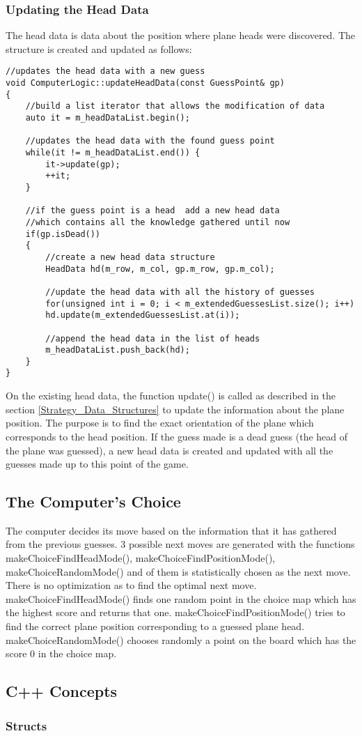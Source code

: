 \subsubsection {Updating the Head Data}

The head data is data about the position where plane heads were discovered. The structure is created and updated as follows:

\begin{lstlisting}
//updates the head data with a new guess
void ComputerLogic::updateHeadData(const GuessPoint& gp)
{
	//build a list iterator that allows the modification of data
	auto it = m_headDataList.begin();
	
	//updates the head data with the found guess point
	while(it != m_headDataList.end()) {
		it->update(gp);
		++it;
	}
	
	//if the guess point is a head  add a new head data
	//which contains all the knowledge gathered until now
	if(gp.isDead())
	{
		//create a new head data structure
		HeadData hd(m_row, m_col, gp.m_row, gp.m_col);
		
		//update the head data with all the history of guesses
		for(unsigned int i = 0; i < m_extendedGuessesList.size(); i++)
		hd.update(m_extendedGuessesList.at(i));
		
		//append the head data in the list of heads
		m_headDataList.push_back(hd);
	}
}
\end{lstlisting}

On the existing head data, the function update() is called as described in the section \ref{Strategy_Data_Structures} to update the information about the plane position. The purpose is to find the exact orientation of the plane which corresponds to the head position. If the guess made is a dead guess (the head of the plane was guessed), a new head data is created and updated with all the guesses made up to this point of the game.


\subsection {The Computer's Choice}

The computer decides its move based on the information that it has gathered from the previous guesses. 3 possible next moves are generated with the functions makeChoiceFindHeadMode(),  makeChoiceFindPositionMode(),  makeChoiceRandomMode() and of them is statistically chosen as the next move. There is no optimization as to find the optimal next move. makeChoiceFindHeadMode() finds one random point in the choice map which has the highest score and returns that one. makeChoiceFindPositionMode() tries to find the correct plane position corresponding to a guessed plane head. makeChoiceRandomMode() chooses randomly a point on the board which has the score 0 in the choice map.





\subsection{C++ Concepts}


\subsubsection{Structs}
